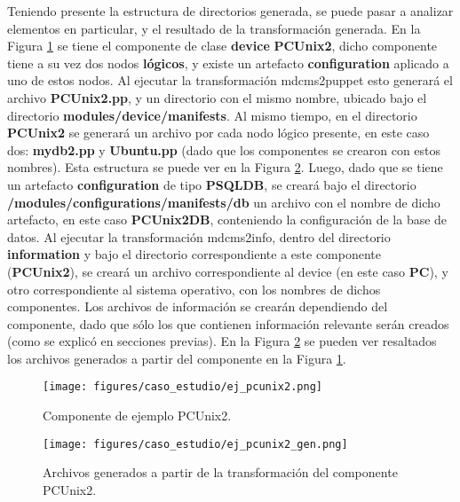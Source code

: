 Teniendo presente la estructura de directorios generada, se puede pasar a analizar elementos en particular, y el resultado de la transformación generada. En la Figura \ref{fig:caso_estudio:ejemplo_pcunix2} se tiene el componente de clase \textbf{device} \textbf{PCUnix2}, dicho componente tiene a su vez dos nodos \textbf{lógicos}, y existe un artefacto \textbf{configuration} aplicado a uno de estos nodos. Al ejecutar la transformación mdcms2puppet esto generará el archivo \textbf{PCUnix2.pp}, y un directorio con el mismo nombre, ubicado bajo el directorio \textbf{modules/device/manifests}. Al mismo tiempo, en el directorio \textbf{PCUnix2} se generará un archivo por cada nodo lógico presente, en este caso dos: \textbf{mydb2.pp} y \textbf{Ubuntu.pp} (dado que los componentes se crearon con estos nombres). Esta estructura se puede ver en la Figura \ref{fig:caso_estudio:ejemplo_pcunix2_gen}.
Luego, dado que se tiene un artefacto \textbf{configuration} de tipo \textbf{PSQLDB}, se creará bajo el directorio \textbf{/modules/configurations/manifests/db} un archivo con el nombre de dicho artefacto, en este caso \textbf{PCUnix2DB}, conteniendo la configuración de la base de datos.
Al ejecutar la transformación mdcms2info, dentro del directorio \textbf{information} y bajo el directorio correspondiente a este componente (\textbf{PCUnix2}), se creará un archivo correspondiente al device (en este caso \textbf{PC}), y otro correspondiente al sistema operativo, con los nombres de dichos componentes. Los archivos de información se crearán dependiendo del componente, dado que sólo los que contienen información relevante serán creados (como se explicó en secciones previas).
En la Figura \ref{fig:caso_estudio:ejemplo_pcunix2_gen} se pueden ver resaltados los archivos generados a partir del componente en la Figura \ref{fig:caso_estudio:ejemplo_pcunix2}.

\begin{figure}[htbp]
    \centering
    \texttt{[image: figures/caso\_estudio/ej\_pcunix2.png]}
    \caption{Componente de ejemplo PCUnix2.}
    \label{fig:caso_estudio:ejemplo_pcunix2}
\end{figure}

\begin{figure}[htbp]
    \centering
    \texttt{[image: figures/caso\_estudio/ej\_pcunix2\_gen.png]}
    \caption{Archivos generados a partir de la transformación del componente PCUnix2.}
    \label{fig:caso_estudio:ejemplo_pcunix2_gen}
\end{figure}


